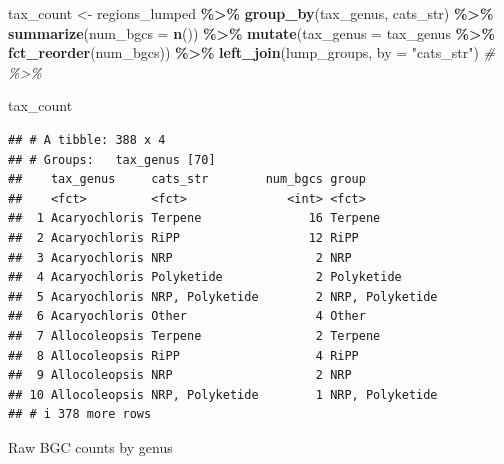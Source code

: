 \documentclass[
]{article}
\newenvironment{Shaded}{\begin{snugshade}}{\end{snugshade}}
\newcommand{\AttributeTok}[1]{\textcolor[rgb]{0.13,0.29,0.53}{#1}}
\newcommand{\CommentTok}[1]{\textcolor[rgb]{0.56,0.35,0.01}{\textit{#1}}}
\newcommand{\FunctionTok}[1]{\textcolor[rgb]{0.13,0.29,0.53}{\textbf{#1}}}
\newcommand{\NormalTok}[1]{#1}
\newcommand{\OtherTok}[1]{\textcolor[rgb]{0.56,0.35,0.01}{#1}}
\newcommand{\SpecialCharTok}[1]{\textcolor[rgb]{0.81,0.36,0.00}{\textbf{#1}}}
\newcommand{\StringTok}[1]{\textcolor[rgb]{0.31,0.60,0.02}{#1}}
\begin{document}
\begin{Shaded}
\begin{Highlighting}[]
\NormalTok{tax\_count }\OtherTok{\textless{}{-}}\NormalTok{ regions\_lumped }\SpecialCharTok{\%\textgreater{}\%}
  \FunctionTok{group\_by}\NormalTok{(tax\_genus, cats\_str) }\SpecialCharTok{\%\textgreater{}\%}
  \FunctionTok{summarize}\NormalTok{(}\AttributeTok{num\_bgcs =} \FunctionTok{n}\NormalTok{()) }\SpecialCharTok{\%\textgreater{}\%}
  \FunctionTok{mutate}\NormalTok{(}\AttributeTok{tax\_genus =}\NormalTok{ tax\_genus }\SpecialCharTok{\%\textgreater{}\%} \FunctionTok{fct\_reorder}\NormalTok{(num\_bgcs)) }\SpecialCharTok{\%\textgreater{}\%}
  \FunctionTok{left\_join}\NormalTok{(lump\_groups, }\AttributeTok{by =} \StringTok{"cats\_str"}\NormalTok{) }\CommentTok{\# \%\textgreater{}\%}

\NormalTok{tax\_count}
\end{Highlighting}
\end{Shaded}

\begin{verbatim}
## # A tibble: 388 x 4
## # Groups:   tax_genus [70]
##    tax_genus     cats_str        num_bgcs group          
##    <fct>         <fct>              <int> <fct>          
##  1 Acaryochloris Terpene               16 Terpene        
##  2 Acaryochloris RiPP                  12 RiPP           
##  3 Acaryochloris NRP                    2 NRP            
##  4 Acaryochloris Polyketide             2 Polyketide     
##  5 Acaryochloris NRP, Polyketide        2 NRP, Polyketide
##  6 Acaryochloris Other                  4 Other          
##  7 Allocoleopsis Terpene                2 Terpene        
##  8 Allocoleopsis RiPP                   4 RiPP           
##  9 Allocoleopsis NRP                    2 NRP            
## 10 Allocoleopsis NRP, Polyketide        1 NRP, Polyketide
## # i 378 more rows
\end{verbatim}

Raw BGC counts by genus
\end{document}
